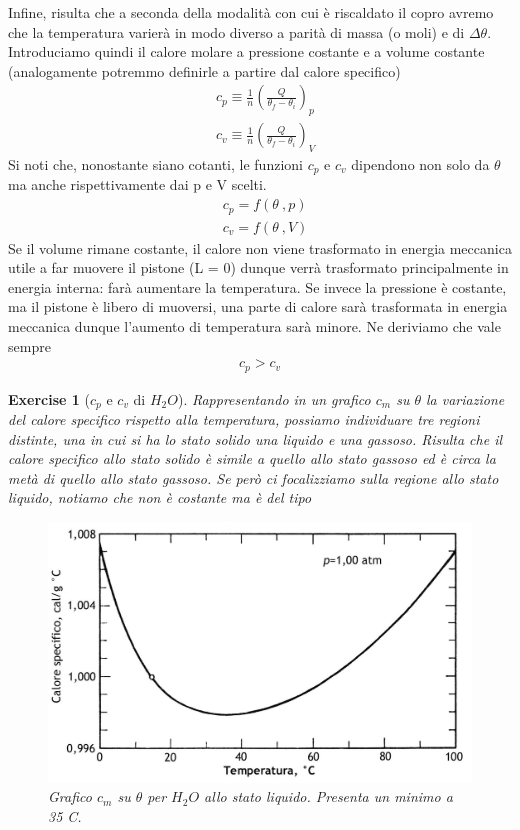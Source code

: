 \documentclass[10pt,a4paper]{article}
\newtheorem{exercise}{Exercise}
\begin{document}
Infine, risulta che a seconda della modalità con cui è riscaldato il copro avremo che la temperatura varierà in modo diverso a parità di massa (o moli) e di $\Delta \theta$. Introduciamo quindi il calore molare a pressione costante e a volume costante (analogamente potremmo definirle a partire dal calore specifico)
\begin{align*} 
	&c_p \equiv \frac{1}{n} \left(\frac{Q}{\theta_f - \theta_i}\right)_p \\
	&c_v \equiv \frac{1}{n} \left(\frac{Q}{\theta_f - \theta_i}\right)_V
\end{align*} 
Si noti che, nonostante siano cotanti, le funzioni $c_p$ e $c_v$ dipendono non solo da $\theta$ ma anche rispettivamente dai p e V scelti. 
\begin{align*} 
	&c_p = f(\theta\ , p)\\
	&c_v = f(\theta\ , V)
\end{align*} 
Se il volume rimane costante, il calore non viene trasformato in energia meccanica utile a far muovere il pistone (L = 0) dunque verrà trasformato principalmente in energia interna: farà aumentare la temperatura. Se invece la pressione è costante, ma il pistone è libero di muoversi, una parte di calore sarà trasformata in energia meccanica dunque l'aumento di temperatura sarà minore. Ne deriviamo che vale sempre
\begin{align*} 
	c_p > c_v
\end{align*}  
\begin{exercise}[$c_p$ e $c_v$ di $H_2 O$]
Rappresentando in un grafico $c_m$ su $\theta$ la variazione del calore specifico rispetto alla temperatura, possiamo individuare tre regioni distinte, una in cui si ha lo stato solido una liquido e una gassoso. Risulta che il calore specifico allo stato solido è simile a quello allo stato gassoso ed è circa la metà di quello allo stato gassoso. Se però ci focalizziamo sulla regione allo stato liquido, notiamo che non è costante ma è del tipo
\begin{figure}[h!]
	\centering
	\includegraphics[width=0.7\linewidth]{"../images/calore specifico acqua"}
	\caption{Grafico $c_m$ su $\theta$ per $H_2O$ allo stato liquido. Presenta un minimo a 35 \textdegree C.}
	\label{fig:calore-specifico-acqua}
\end{figure}
\FloatBarrier
\end{exercise}
\end{document}
